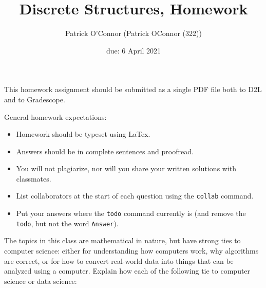 \documentclass{article}
\title{Discrete Structures, Homework \hwnum}
\author{Patrick O'Connor (Patrick OConnor (322))}
\date{due: 6 April 2021}
\begin{document}
\maketitle

This homework assignment should be
submitted as a single PDF file both to D2L and to Gradescope.

General homework expectations:
\begin{itemize}
    \item Homework should be typeset using LaTex.
    \item Answers should be in complete sentences and proofread.
    \item You will not plagiarize, nor will you share your written solutions
        with classmates.
    \item List collaborators at the start of each question using the \texttt{collab} command.
    \item Put your answers where the \texttt{todo} command currently is (and
        remove the \texttt{todo}, but not the word \texttt{Answer}).
\end{itemize}


 

The topics in this class are mathematical in nature, but have strong ties to
computer science: either for understanding how computers work, why algorithms are
correct, or for how to convert real-world data into things that can be analyzed
using a computer.  Explain how each of the following tie to computer science or
data science:
\end{document}
